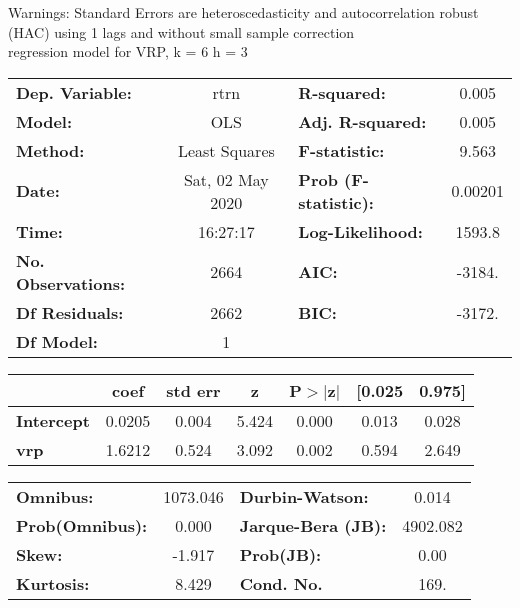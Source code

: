 Warnings: \newline
 [1] Standard Errors are heteroscedasticity and autocorrelation robust (HAC) using 1 lags and without small sample correction\\ 

regression model for VRP, k = 6 h = 3\begin{center}
\begin{tabular}{lclc}
\toprule
\textbf{Dep. Variable:}    &       rtrn       & \textbf{  R-squared:         } &     0.005   \\
\textbf{Model:}            &       OLS        & \textbf{  Adj. R-squared:    } &     0.005   \\
\textbf{Method:}           &  Least Squares   & \textbf{  F-statistic:       } &     9.563   \\
\textbf{Date:}             & Sat, 02 May 2020 & \textbf{  Prob (F-statistic):} &  0.00201    \\
\textbf{Time:}             &     16:27:17     & \textbf{  Log-Likelihood:    } &    1593.8   \\
\textbf{No. Observations:} &        2664      & \textbf{  AIC:               } &    -3184.   \\
\textbf{Df Residuals:}     &        2662      & \textbf{  BIC:               } &    -3172.   \\
\textbf{Df Model:}         &           1      & \textbf{                     } &             \\
\bottomrule
\end{tabular}
\begin{tabular}{lcccccc}
                   & \textbf{coef} & \textbf{std err} & \textbf{z} & \textbf{P$> |$z$|$} & \textbf{[0.025} & \textbf{0.975]}  \\
\midrule
\textbf{Intercept} &       0.0205  &        0.004     &     5.424  &         0.000        &        0.013    &        0.028     \\
\textbf{vrp}       &       1.6212  &        0.524     &     3.092  &         0.002        &        0.594    &        2.649     \\
\bottomrule
\end{tabular}
\begin{tabular}{lclc}
\textbf{Omnibus:}       & 1073.046 & \textbf{  Durbin-Watson:     } &    0.014  \\
\textbf{Prob(Omnibus):} &   0.000  & \textbf{  Jarque-Bera (JB):  } & 4902.082  \\
\textbf{Skew:}          &  -1.917  & \textbf{  Prob(JB):          } &     0.00  \\
\textbf{Kurtosis:}      &   8.429  & \textbf{  Cond. No.          } &     169.  \\
\bottomrule
\end{tabular}
\end{center}

